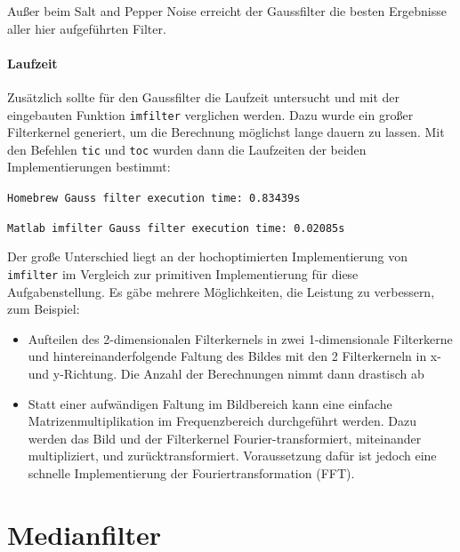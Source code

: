 \smallskip

Außer beim Salt and Pepper Noise erreicht der Gaussfilter die besten Ergebnisse aller hier aufgeführten Filter.

\clearpage



\paragraph{Laufzeit}

Zusätzlich sollte für den Gaussfilter die Laufzeit untersucht und mit der eingebauten Funktion \texttt{imfilter} verglichen werden. Dazu wurde ein großer Filterkernel generiert, um die Berechnung möglichst lange dauern zu lassen. Mit den Befehlen \texttt{tic} und \texttt{toc} wurden dann die Laufzeiten der beiden Implementierungen bestimmt:

\smallskip

\texttt{Homebrew Gauss filter execution time: 0.83439s}
 
\texttt{Matlab imfilter Gauss filter execution time: 0.02085s}

\smallskip

Der große Unterschied liegt an der hochoptimierten Implementierung von \texttt{imfilter} im Vergleich zur primitiven Implementierung für diese Aufgabenstellung. Es gäbe mehrere Möglichkeiten, die Leistung zu verbessern, zum Beispiel:

\begin{itemize}
 \item Aufteilen des 2-dimensionalen Filterkernels in zwei 1-dimensionale Filterkerne und hintereinanderfolgende Faltung des Bildes mit den 2 Filterkerneln in x- und y-Richtung. Die Anzahl der Berechnungen nimmt dann drastisch ab
 
 \item Statt einer aufwändigen Faltung im Bildbereich kann eine einfache Matrizenmultiplikation im Frequenzbereich durchgeführt werden. Dazu werden das Bild und der Filterkernel Fourier-transformiert, miteinander multipliziert, und zurücktransformiert. Voraussetzung dafür ist jedoch eine schnelle Implementierung der Fouriertransformation (FFT).
\end{itemize}

\clearpage



\section{Medianfilter}

